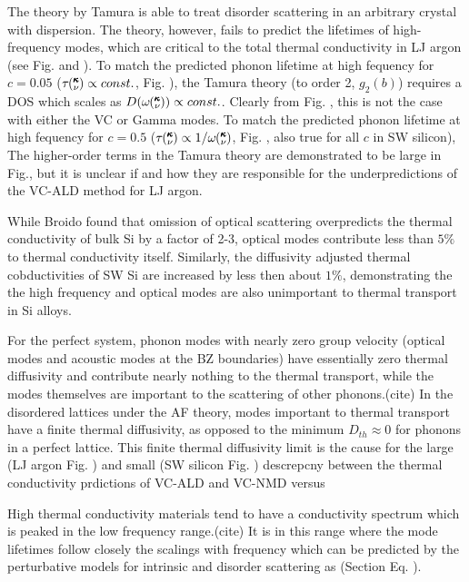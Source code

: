 \documentclass[aps,prb,onecolumn,preprint,superscriptaddress,amsmath,amssymb,floatfix]{revtex4}
\newcommand{\kv}{\mspace{-4.0mu}\left(\mspace{-8.0mu}
\begin{smallmatrix}&\pmb{\kappa} \\&\nu\end{smallmatrix}
\mspace{-3.0mu}\right)}
\begin{document}
The theory by Tamura is able to treat disorder scattering in an arbitrary 
crystal with dispersion. The theory, however, fails to predict the 
lifetimes of high-frequency modes, which are critical to the total 
thermal conductivity in LJ argon (see Fig. and ). To match the predicted 
phonon lifetime at high fequency for $c=0.05$ 
($\tau\kv \propto const.$, Fig. ), 
the Tamura theory (to order 2, $g_2(b)$) requires a DOS which scales as 
$D(\omega\kv) \propto const.$. Clearly from Fig. , this is not the case 
with either the VC or Gamma modes. To match the predicted 
phonon lifetime at high fequency for $c=0.5$ 
($\tau\kv \propto 1/\omega\kv$, Fig. , also true for all $c$ in SW silicon), 
The higher-order terms in the Tamura theory are demonstrated to be large 
in Fig., but it is unclear if and how they are responsible for the 
underpredictions of the VC-ALD method for LJ argon. 

While Broido found that omission of optical scattering overpredicts 
the thermal 
conductivity of bulk Si by a factor of 2-3, 
optical modes contribute less than $5\%$ 
to thermal conductivity itself. Similarly, the diffusivity adjusted thermal 
cobductivities of SW Si are increased by less then about $1\%$, demonstrating the 
the high frequency and optical modes are also unimportant to thermal transport 
in Si alloys. 

For the perfect system, phonon modes with nearly zero group velocity 
(optical modes and acoustic modes at the BZ boundaries) have essentially 
zero thermal diffusivity and contribute nearly 
nothing to the thermal transport, while the modes themselves 
are important to the 
scattering of other phonons.(cite) In the disordered lattices under the 
AF theory, modes important to thermal transport have a finite thermal 
diffusivity, as opposed to  the minimum $D_{th} \approx 0 $ for phonons 
in a perfect lattice. This finite thermal diffusivity limit is the cause 
for the large (LJ argon Fig. ) and small (SW silicon Fig. ) 
descrepcny between the thermal conductivity prdictions of VC-ALD and 
VC-NMD versus 

High thermal conductivity materials tend to have a conductivity spectrum 
which is peaked in the low frequency range.(cite) 
It is in this range where the mode 
lifetimes follow closely the scalings with frequency which can be 
predicted by the perturbative models for intrinsic and disorder scattering as 
(Section Eq. ).
\end{document}
